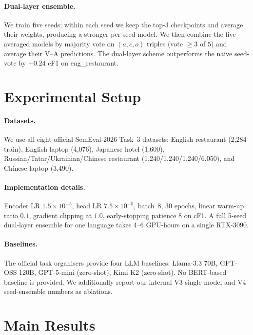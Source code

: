 \documentclass[runningheads]{llncs}
\begin{document}
\paragraph{Dual-layer ensemble.}
We train five seeds; within each seed we keep the top-3 checkpoints
and average their weights, producing a stronger per-seed model. We
then combine the five averaged models by majority vote on
$(a, c, o)$ triples (vote $\geq 3$ of $5$) and average their V--A
predictions. The dual-layer scheme outperforms the naive seed-vote by
$+0.24$ cF1 on eng\_restaurant.

\section{Experimental Setup}
\label{sec:setup}

\paragraph{Datasets.}
We use all eight official SemEval-2026 Task~3 datasets: English
restaurant (2{,}284 train), English laptop (4{,}076), Japanese hotel
(1{,}600), Russian/Tatar/Ukrainian/Chinese restaurant
(1{,}240/1{,}240/1{,}240/6{,}050), and Chinese laptop (3{,}490).

\paragraph{Implementation details.}
Encoder LR $1.5\times10^{-5}$, head LR $7.5\times10^{-5}$, batch~8,
30 epochs, linear warm-up ratio $0.1$, gradient clipping at $1.0$,
early-stopping patience 8 on cF1.
A full 5-seed dual-layer ensemble for one language takes 4--6
GPU-hours on a single RTX-3090.

\paragraph{Baselines.}
The official task organisers provide four LLM baselines:
Llama-3.3 70B, GPT-OSS 120B, GPT-5-mini (zero-shot), Kimi K2
(zero-shot). No BERT-based baseline is provided. We additionally
report our internal V3 single-model and V4 seed-ensemble numbers as
ablations.

\section{Main Results}
\label{sec:results}
\end{document}
